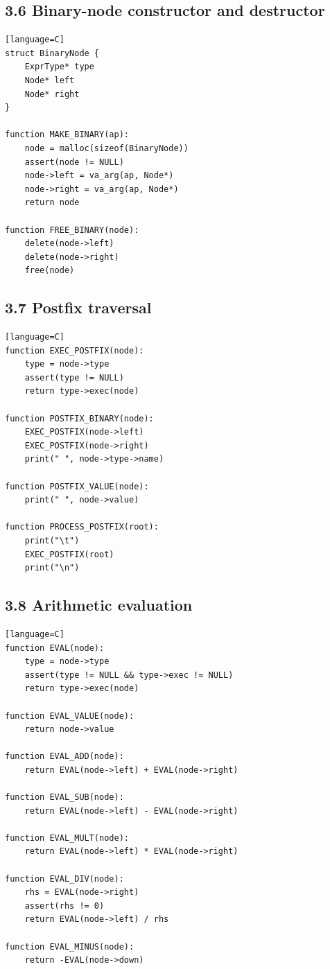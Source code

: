 \documentclass[11pt]{article}
\begin{document}
\subsection{3.6 Binary-node constructor and
destructor}\label{binary-node-constructor-and-destructor}

\begin{verbatim}[language=C]
struct BinaryNode {
    ExprType* type
    Node* left
    Node* right
}

function MAKE_BINARY(ap):
    node = malloc(sizeof(BinaryNode))
    assert(node != NULL)
    node->left = va_arg(ap, Node*)
    node->right = va_arg(ap, Node*)
    return node

function FREE_BINARY(node):
    delete(node->left)
    delete(node->right)
    free(node)
\end{verbatim}

\subsection{3.7 Postfix traversal}\label{postfix-traversal}

\begin{verbatim}[language=C]
function EXEC_POSTFIX(node):
    type = node->type
    assert(type != NULL)
    return type->exec(node)

function POSTFIX_BINARY(node):
    EXEC_POSTFIX(node->left)
    EXEC_POSTFIX(node->right)
    print(" ", node->type->name)

function POSTFIX_VALUE(node):
    print(" ", node->value)

function PROCESS_POSTFIX(root):
    print("\t")
    EXEC_POSTFIX(root)
    print("\n")
\end{verbatim}

\subsection{3.8 Arithmetic evaluation}\label{arithmetic-evaluation}

\begin{verbatim}[language=C]
function EVAL(node):
    type = node->type
    assert(type != NULL && type->exec != NULL)
    return type->exec(node)

function EVAL_VALUE(node):
    return node->value

function EVAL_ADD(node):
    return EVAL(node->left) + EVAL(node->right)

function EVAL_SUB(node):
    return EVAL(node->left) - EVAL(node->right)

function EVAL_MULT(node):
    return EVAL(node->left) * EVAL(node->right)

function EVAL_DIV(node):
    rhs = EVAL(node->right)
    assert(rhs != 0)
    return EVAL(node->left) / rhs

function EVAL_MINUS(node):
    return -EVAL(node->down)
\end{verbatim}
\end{document}
